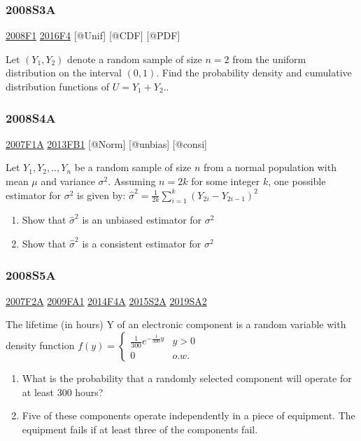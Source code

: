 \documentclass[6pt,Portrait]{article}
\begin{document}
\hypertarget{s3a}{%
\subsubsection{2008S3A}\label{s3a}}

\protect\hyperlink{f1-3}{2008F1} \protect\hyperlink{f4-6}{2016F4}
{[}@Unif{]} {[}@CDF{]} {[}@PDF{]}

Let \((Y_1,Y_2)\) denote a random sample of size \(n=2\) from the
uniform distribution on the interval \((0, 1)\). Find the probability
density and cumulative distribution functions of \(U=Y_1+Y_2\)..

\hypertarget{s4a}{%
\subsubsection{2008S4A}\label{s4a}}

\protect\hyperlink{f1a}{2007F1A} \protect\hyperlink{fb1-2}{2013FB1}
{[}@Norm{]} {[}@unbias{]} {[}@consi{]}

Let \(Y_1,Y_2,..,Y_{n}\) be a random sample of size \(n\) from a normal
population with mean \(\mu\) and variance \(\sigma^2\). Assuming
\(n=2k\) for some integer \(k\), one possible estimator for \(\sigma^2\)
is given by: \(\hat\sigma^2=\frac1{2k}\sum_{i=1}^k(Y_{2i}-Y_{2i-1})^2\)

\begin{enumerate}
\def\labelenumi{(\alph{enumi})}
\item
  Show that \(\hat\sigma^2\) is an unbiased estimator for \(\sigma^2\)
\item
  Show that \(\hat\sigma^2\) is a consistent estimator for \(\sigma^2\)
\end{enumerate}

\hypertarget{s5a}{%
\subsubsection{2008S5A}\label{s5a}}

\protect\hyperlink{f2a}{2007F2A} \protect\hyperlink{fa1}{2009FA1}
\protect\hyperlink{f4a-1}{2014F4A} \protect\hyperlink{s2a-1}{2015S2A}
\protect\hyperlink{sa2-3}{2019SA2}

The lifetime (in hours) Y of an electronic component is a random
variable with density function
\(f(y)=\begin{cases}\frac1{300}e^{-\frac1{300}y}& y>0\\0& o.w.\end{cases}\)

\begin{enumerate}
\def\labelenumi{(\alph{enumi})}
\item
  What is the probability that a randomly selected component will
  operate for at least 300 hours?
\item
  Five of these components operate independently in a piece of
  equipment. The equipment fails if at least three of the components
  fail.
\end{enumerate}
\end{document}
